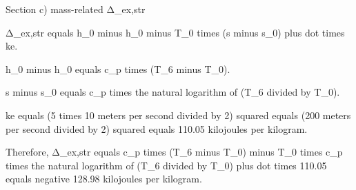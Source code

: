 Section c) mass-related Δ_ex,str

Δ_ex,str equals h_0 minus h_0 minus T_0 times (s minus s_0) plus dot times ke.

h_0 minus h_0 equals c_p times (T_6 minus T_0).

s minus s_0 equals c_p times the natural logarithm of (T_6 divided by T_0).

ke equals (5 times 10 meters per second divided by 2) squared equals (200 meters per second divided by 2) squared equals 110.05 kilojoules per kilogram.

Therefore, Δ_ex,str equals c_p times (T_6 minus T_0) minus T_0 times c_p times the natural logarithm of (T_6 divided by T_0) plus dot times 110.05 equals negative 128.98 kilojoules per kilogram.